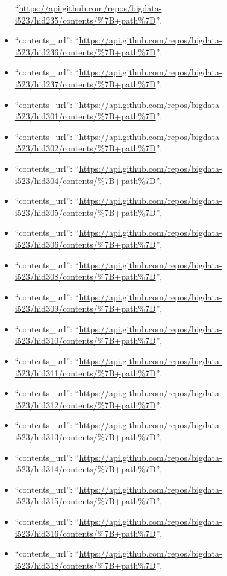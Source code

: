 \begin{itemize}
  ``\url{https://api.github.com/repos/bigdata-i523/hid235/contents/\%7B+path\%7D}'',
\item
  ``contents\_url'':
  ``\url{https://api.github.com/repos/bigdata-i523/hid236/contents/\%7B+path\%7D}'',
\item
  ``contents\_url'':
  ``\url{https://api.github.com/repos/bigdata-i523/hid237/contents/\%7B+path\%7D}'',
\item
  ``contents\_url'':
  ``\url{https://api.github.com/repos/bigdata-i523/hid301/contents/\%7B+path\%7D}'',
\item
  ``contents\_url'':
  ``\url{https://api.github.com/repos/bigdata-i523/hid302/contents/\%7B+path\%7D}'',
\item
  ``contents\_url'':
  ``\url{https://api.github.com/repos/bigdata-i523/hid304/contents/\%7B+path\%7D}'',
\item
  ``contents\_url'':
  ``\url{https://api.github.com/repos/bigdata-i523/hid305/contents/\%7B+path\%7D}'',
\item
  ``contents\_url'':
  ``\url{https://api.github.com/repos/bigdata-i523/hid306/contents/\%7B+path\%7D}'',
\item
  ``contents\_url'':
  ``\url{https://api.github.com/repos/bigdata-i523/hid308/contents/\%7B+path\%7D}'',
\item
  ``contents\_url'':
  ``\url{https://api.github.com/repos/bigdata-i523/hid309/contents/\%7B+path\%7D}'',
\item
  ``contents\_url'':
  ``\url{https://api.github.com/repos/bigdata-i523/hid310/contents/\%7B+path\%7D}'',
\item
  ``contents\_url'':
  ``\url{https://api.github.com/repos/bigdata-i523/hid311/contents/\%7B+path\%7D}'',
\item
  ``contents\_url'':
  ``\url{https://api.github.com/repos/bigdata-i523/hid312/contents/\%7B+path\%7D}'',
\item
  ``contents\_url'':
  ``\url{https://api.github.com/repos/bigdata-i523/hid313/contents/\%7B+path\%7D}'',
\item
  ``contents\_url'':
  ``\url{https://api.github.com/repos/bigdata-i523/hid314/contents/\%7B+path\%7D}'',
\item
  ``contents\_url'':
  ``\url{https://api.github.com/repos/bigdata-i523/hid315/contents/\%7B+path\%7D}'',
\item
  ``contents\_url'':
  ``\url{https://api.github.com/repos/bigdata-i523/hid316/contents/\%7B+path\%7D}'',
\item
  ``contents\_url'':
  ``\url{https://api.github.com/repos/bigdata-i523/hid318/contents/\%7B+path\%7D}'',

\end{itemize}
